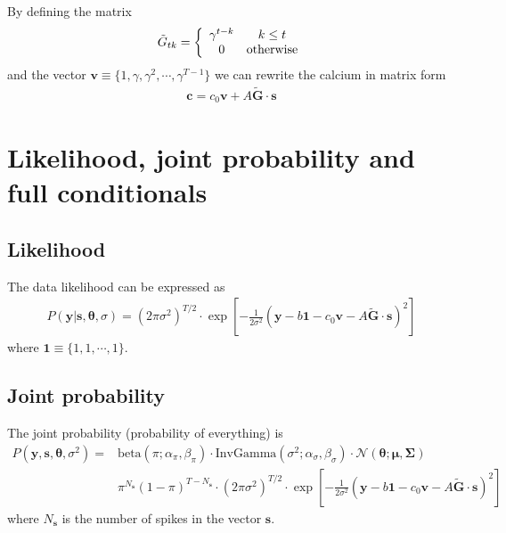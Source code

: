 \documentclass{article}
\theoremstyle{remark}
\begin{document}
By defining the matrix
\begin{align}
    \tilde G_{tk} = \left\lbrace\begin{array}{c c}
        \gamma^{t-k} & k\le t\\
        0 & \mathrm{otherwise}
    \end{array}\right.
\end{align}
and the vector $\bm{v} \equiv \lbrace 1,\gamma,\gamma^2,\cdots,\gamma^{T-1}\rbrace$ 
we can rewrite the calcium in matrix form
\begin{align}
    \bm{c} = c_0 \bm{v} + A \bm{\tilde G}\cdot \bm{s}
\end{align}

\section{Likelihood, joint probability and full conditionals}
\subsection{Likelihood}
The data likelihood can be expressed as
\begin{align}
    P(\bm{y} | \bm{s}, \bm{\theta},\sigma) = (2\pi\sigma^2)^{T/2}\cdot \exp\left[-\frac{1}{2\sigma^2}(\bm{y}-b\bm{1} - c_0 \bm{v}-A\bm{\tilde G}\cdot \bm{s})^2\right]
\end{align}
where $\bm{1}\equiv \lbrace 1,1,\cdots,1\rbrace$. 

\subsection{Joint probability}
The joint probability (probability of everything) is
\begin{align}
    P(\bm{y},\bm{s},\bm{\theta},\sigma^2) =& \mathrm{beta}(\pi; \alpha_\pi,\beta_\pi)\cdot \mathrm{InvGamma}(\sigma^2;\alpha_\sigma,\beta_\sigma)\cdot \mathcal{N}(\bm{\theta};\bm{\mu},\bm{\Sigma})\nonumber\\
    &\pi^{N_{\bm{s}}}(1-\pi)^{T-N_{\bm{s}}}\cdot (2\pi\sigma^2)^{T/2}\cdot \exp\left[-\frac{1}{2\sigma^2}(\bm{y}-b\bm{1} - c_0 \bm{v}-A\bm{\tilde G}\cdot \bm{s})^2\right]
\end{align}
where $N_{\bm{s}}$ is the number of spikes in the vector $\bm{s}$.
\end{document}
